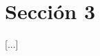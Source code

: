 \pagestyle{fancy}
\fancyhead[l]{\autorUO}
\fancyfoot[l]{\asignaturaAbbr}
\fancyfoot[r]{\fecha}

\section{Sección 3} \label{sec:2}
[...]